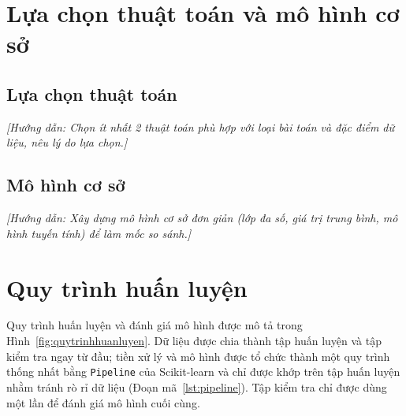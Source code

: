 \documentclass[12pt,a4paper,oneside]{report}
\newcommand{\huongdan}[1]{{\color{guide}\itshape [Hướng dẫn: #1]}}
\begin{document}
\section{Lựa chọn thuật toán và mô hình cơ sở}

\subsection{Lựa chọn thuật toán}
\huongdan{Chọn ít nhất 2 thuật toán phù hợp với loại bài toán và đặc điểm
dữ liệu, nêu lý do lựa chọn.}

\subsection{Mô hình cơ sở}
\huongdan{Xây dựng mô hình cơ sở đơn giản (lớp đa số, giá trị trung bình,
mô hình tuyến tính) để làm mốc so sánh.}

\section{Quy trình huấn luyện}
Quy trình huấn luyện và đánh giá mô hình được mô tả trong
Hình~\ref{fig:quytrinhhuanluyen}. Dữ liệu được chia thành tập huấn luyện và
tập kiểm tra ngay từ đầu; tiền xử lý và mô hình được tổ chức thành một quy
trình thống nhất bằng \texttt{Pipeline} của Scikit-learn \cite{pedregosa2011}
và chỉ được khớp trên tập huấn luyện nhằm tránh rò rỉ dữ liệu
(Đoạn mã~\ref{lst:pipeline}). Tập kiểm tra chỉ được dùng một lần để đánh giá
mô hình cuối cùng.
\end{document}
